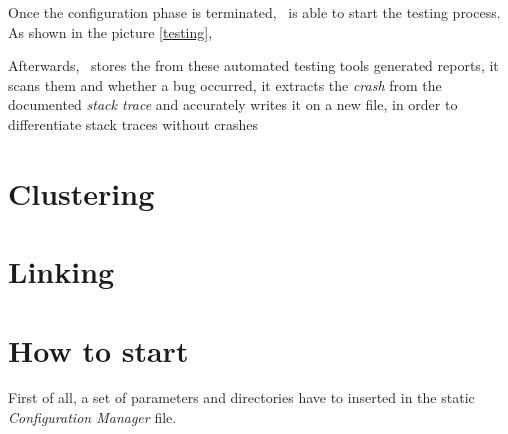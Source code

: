 



Once the configuration phase is terminated, \toolname\ is able to start the testing process. 
As shown in the picture \ref{testing},  








Afterwards, \toolname\ stores the from these automated testing tools generated reports, it scans them and whether a bug occurred, it extracts the \textit{crash} from the documented \textit{stack trace} and accurately writes it on a new file, in order to differentiate stack traces without crashes

\section{Clustering}

\section{Linking}

\section{How to start \toolname}
First of all, a set of parameters and directories have to inserted in the static \textit{Configuration Manager} file.

